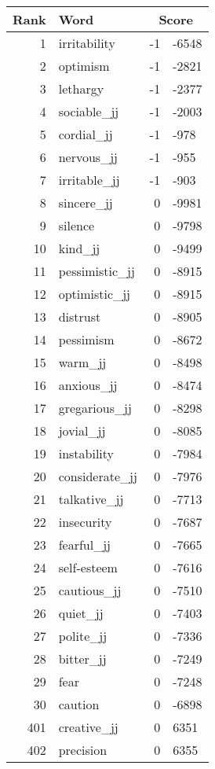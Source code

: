 \begin{longtable}[!htbp]{| rlr@{.}l |}
    \hline
    \textbf{Rank} & \textbf{Word} & \multicolumn{2}{c|}{\textbf{Score}} \\
    \hline
    \endhead
    1 & irritability & -1 & -6548 \\
    2 & optimism & -1 & -2821 \\
    3 & lethargy & -1 & -2377 \\
    4 & sociable\_jj & -1 & -2003 \\
    5 & cordial\_jj & -1 & -978 \\
    6 & nervous\_jj & -1 & -955 \\
    7 & irritable\_jj & -1 & -903 \\
    8 & sincere\_jj & 0 & -9981 \\
    9 & silence & 0 & -9798 \\
    10 & kind\_jj & 0 & -9499 \\
    11 & pessimistic\_jj & 0 & -8915 \\
    12 & optimistic\_jj & 0 & -8915 \\
    13 & distrust & 0 & -8905 \\
    14 & pessimism & 0 & -8672 \\
    15 & warm\_jj & 0 & -8498 \\
    16 & anxious\_jj & 0 & -8474 \\
    17 & gregarious\_jj & 0 & -8298 \\
    18 & jovial\_jj & 0 & -8085 \\
    19 & instability & 0 & -7984 \\
    20 & considerate\_jj & 0 & -7976 \\
    21 & talkative\_jj & 0 & -7713 \\
    22 & insecurity & 0 & -7687 \\
    23 & fearful\_jj & 0 & -7665 \\
    24 & self-esteem & 0 & -7616 \\
    25 & cautious\_jj & 0 & -7510 \\
    26 & quiet\_jj & 0 & -7403 \\
    27 & polite\_jj & 0 & -7336 \\
    28 & bitter\_jj & 0 & -7249 \\
    29 & fear & 0 & -7248 \\
    30 & caution & 0 & -6898 \\
    401 & creative\_jj & 0 & 6351 \\
    402 & precision & 0 & 6355 \\

\end{longtable}
